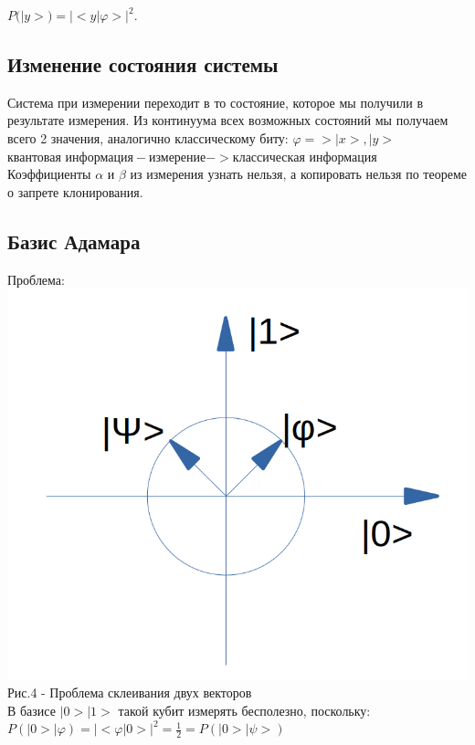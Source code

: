 \documentclass[11pt]{report}
\begin{document}
$P(|y>)=|<y|\varphi>|^2$.\\

\subsection{Изменение состояния системы}
Система при измерении переходит в то состояние, которое мы получили в результате измерения. Из континуума всех возможных состояний мы получаем всего 2 значения, аналогично классическому биту: $\varphi => {|x>,|y>}$ \\

$\text{квантовая информация}-\text{измерение}->\text{классическая информация}$\\

Коэффициенты $\alpha$ и $\beta$ из измерения узнать нельзя, а копировать нельзя по теореме о 
запрете клонирования.

\subsection{Базис Адамара}
Проблема:\\
\includegraphics[scale=0.3]{adamar}\\
Рис.4 - Проблема склеивания двух векторов \\

В базисе $|0>|1>$ такой кубит измерять бесполезно, поскольку: \\

$P(|0>|\varphi) = |<\varphi|0>|^2 = \frac{1}{2} = P(|0>|\psi>)$\\
\end{document}
